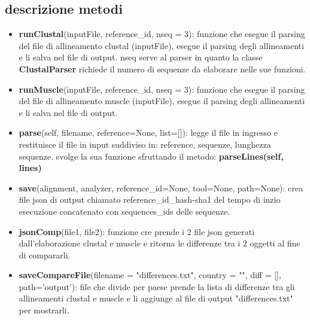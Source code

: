 \documentclass[12pt]{article}
\begin{document}
	\subsection{descrizione metodi}
	\begin{itemize}
\item 	\textbf{runClustal}(inputFile, reference\_id, nseq = 3): funzione che esegue il parsing del file di allineamento clustal (inputFile), esegue il parsing degli allineamenti e li salva nel file di output. \newline nseq serve al parser in quanto la classe \textbf{ClustalParser} richiede il numero di sequenze da elaborare nelle sue funzioni.
\item		\textbf{runMuscle}(inputFile, reference\_id, nseq = 3): funzione che esegue il parsing del file di allineamento muscle (inputFile), esegue il parsing degli allineamenti e li salva nel file di output. \newline
\item		\textbf{parse}(self, filename, reference=None, list=[]):  legge il file in ingresso e restituisce il file in input suddiviso in: reference, sequenze, lunghezza sequenze.
	svolge la sua funzione sfruttando il metodo: \textbf{parseLines(self, lines)}
\item		\textbf{save}(alignment, analyzer, reference\_id=None, tool=None, path=None): crea file json di output chiamato reference\_id\_hash-sha1 del tempo di inzio esecuzione concatenato con sequences\_ids delle sequenze.
		
\item		\textbf{jsonComp}(file1, file2): funzione cre prende i 2 file json generati dall'elaborazione clustal e muscle e ritorna le differenze tra i 2 oggetti al fine di compararli.
		
\item		\textbf{saveCompareFile}(filename = "differences.txt", country = "", diff = [], path='output'): file che divide per paese prende la lista di differenze tra gli allineamenti clustal e muscle e li aggiunge al file di output "differences.txt" per mostrarli.
		
	\end{itemize}
\end{document}
